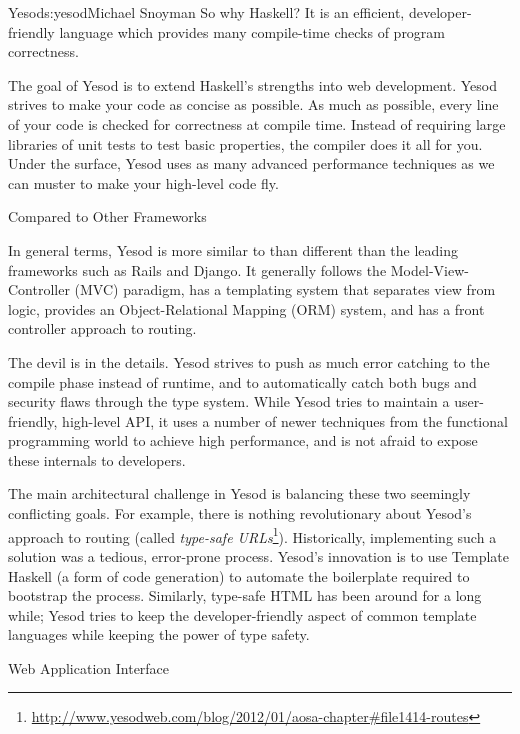 \begin{aosachapter}{Yesod}{s:yesod}{Michael Snoyman}
So why Haskell? It is an efficient, developer-friendly language which
provides many compile-time checks of program correctness.

The goal of Yesod is to extend Haskell's strengths into web
development. Yesod strives to make your code as concise as
possible. As much as possible, every line of your code is checked for
correctness at compile time. Instead of requiring large libraries of
unit tests to test basic properties, the compiler does it all for
you. Under the surface, Yesod uses as many advanced performance
techniques as we can muster to make your high-level code fly.

\begin{aosasect1}{Compared to Other Frameworks}

In general terms, Yesod is more similar to than different than 
the leading frameworks such as Rails and Django. It generally
follows the Model-View-Controller (MVC) paradigm, has a templating
system that separates view from logic, provides an Object-Relational
Mapping (ORM) system, and has a front controller approach to routing.

The devil is in the details. Yesod strives to push as much error
catching to the compile phase instead of runtime, and to automatically
catch both bugs and security flaws through the type system. While
Yesod tries to maintain a user-friendly, high-level API, it uses a
number of newer techniques from the functional programming world to
achieve high performance, and is not afraid to expose these internals
to developers.

The main architectural challenge in Yesod is balancing these two
seemingly conflicting goals. For example, there is nothing
revolutionary about Yesod's approach to routing (called
\emph{type-safe URLs}\footnote{\url{http://www.yesodweb.com/blog/2012/01/aosa-chapter#file1414-routes}}).
Historically, implementing such a solution was a tedious, error-prone
process. Yesod's innovation is to use Template Haskell (a form of code
generation) to automate the boilerplate required to bootstrap the
process. Similarly, type-safe HTML has been around for a long while;
Yesod tries to keep the developer-friendly aspect of common template
languages while keeping the power of type safety.

\end{aosasect1}

\begin{aosasect1}{Web Application Interface}


\end{aosasect1}
\end{aosachapter}
